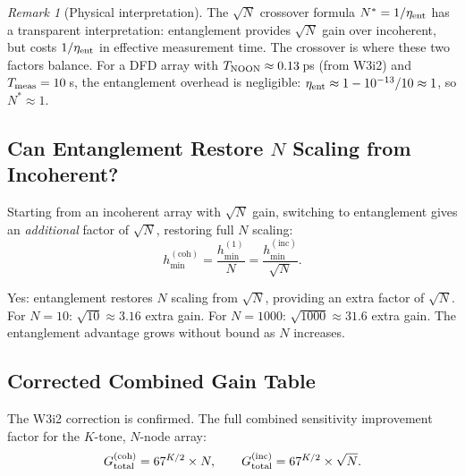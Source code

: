 \documentclass[11pt]{article}
\theoremstyle{definition}
\theoremstyle{remark}
\newtheorem{remark}[theorem]{Remark}
\begin{document}
\begin{remark}[Physical interpretation]
The $\sqrt{N}$ crossover formula $N^* = 1/\eta_{\rm ent}$ has a transparent
interpretation: entanglement provides $\sqrt{N}$ gain over incoherent, but
costs $1/\eta_{\rm ent}$ in effective measurement time. The crossover is where
these two factors balance. For a DFD array with $T_{\rm NOON} \approx 0.13$\,ps
(from W3i2) and $T_{\rm meas} = 10$\,s, the entanglement overhead is negligible:
$\eta_{\rm ent} \approx 1 - 10^{-13}/10 \approx 1$, so $N^* \approx 1$.
\end{remark}

\subsection{Can Entanglement Restore $N$ Scaling from Incoherent?}

Starting from an incoherent array with $\sqrt{N}$ gain, switching to
entanglement gives an \emph{additional} factor of $\sqrt{N}$, restoring
full $N$ scaling:
\begin{equation}
h_{\min}^{(\mathrm{coh})} = \frac{h_{\min}^{(1)}}{N}
= \frac{h_{\min}^{(\mathrm{inc})}}{\sqrt{N}}.
\end{equation}

Yes: entanglement restores $N$ scaling from $\sqrt{N}$, providing an
extra factor of $\sqrt{N}$. For $N = 10$: $\sqrt{10} \approx 3.16$ extra gain.
For $N = 1000$: $\sqrt{1000} \approx 31.6$ extra gain. The entanglement advantage
grows without bound as $N$ increases.

\subsection{Corrected Combined Gain Table}

The W3i2 correction is confirmed. The full combined sensitivity improvement
factor for the $K$-tone, $N$-node array:
\begin{equation}
G_{\rm total}^{(\rm coh)} = 67^{K/2} \times N,
\qquad
G_{\rm total}^{(\rm inc)} = 67^{K/2} \times \sqrt{N}.
\end{equation}
\end{document}
